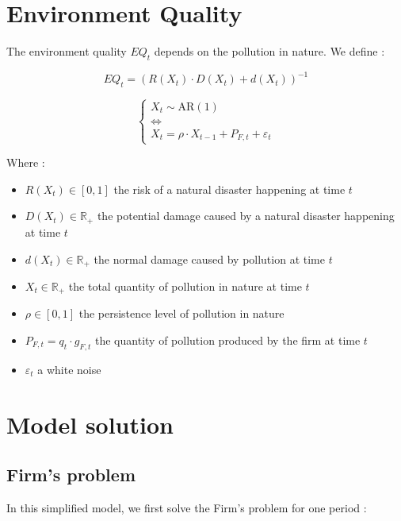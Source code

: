 \documentclass{article}
\begin{document}
\section{Environment Quality}

The environment quality $EQ_{t}$ depends on the pollution in nature. We define : 

\begin{equation}
    EQ_{t}=\left(R(X_{t})\cdot D(X_{t})+d(X_{t})\right)^{-1}
\end{equation}

\begin{equation}
    \begin{cases}
        X_{t}\sim \text{AR}(1) \\
        \iff \\
        X_{t}=\rho\cdot X_{t-1}+P_{F,t}+\varepsilon_{t}
    \end{cases}
\end{equation}

Where :
\begin{itemize}
    \item $R(X_t)\in\left[0,1\right]$ the risk of a natural disaster happening at time $t$
    \item $D(X_t)\in\mathbb{R}_{+}$ the potential damage caused by a natural disaster happening at time $t$
    \item $d(X_t)\in\mathbb{R}_{+}$ the normal damage caused by pollution at time $t$
    \item $X_{t}\in\mathbb{R}_{+}$ the total quantity of pollution in nature at time $t$
    \item $\rho \in \left[0,1\right]$ the persistence level of pollution in nature
    \item $P_{F,t}=q_{t}\cdot g_{F,t}$ the quantity of pollution produced by the firm at time ${t}$
    \item $\varepsilon_{t}$ a white noise 
\end{itemize}

\section{Model solution}

\subsection{Firm's problem}

In this simplified model, we first solve the Firm's problem for one period : 
\end{document}
